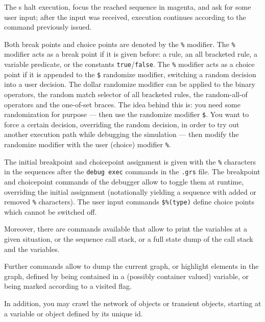 The s halt execution, focus the reached sequence in magenta, and ask for some user input;
after the input was received, execution continues according to the command previously issued.

Both break points and choice points are denoted by the \texttt{\%} modifier.
The \texttt{\%} modifier acts as a break point if it is given before: a rule, an all bracketed rule, a variable predicate, or the constants \texttt{true}/\texttt{false}.
The \texttt{\%} modifier acts as a choice point if it is appended to the \texttt{\$} randomize modifier, switching a random decision into a user decision.
The dollar randomize modifier can be applied to the binary operators, the random match selector of all bracketed rules, the random-all-of operators and the one-of-set braces.
The idea behind this is: you need some randomization for  purpose --- then use the randomize modifier \texttt{\$}.
You want to force a certain decision, overriding the random decision, in order to try out another execution path while debugging the simulation --- then modify the randomize modifier with the user (choice) modifier \texttt{\%}.

The initial breakpoint and choicepoint assignment is given with the \texttt{\%} characters in the sequences after the \texttt{debug exec} commands in the \texttt{.grs} file.
The breakpoint and choicepoint commands of the debugger allow to toggle them at runtime, overriding the initial assignment (notationally yielding a sequence with added or removed \texttt{\%} characters).
The user input commands \texttt{\$\%(type)} define choice points which cannot be switched off.

Moreover, there are commands available that allow to print the variables at a given situation, or the sequence call stack, or a full state dump of the call stack and the variables.

Further commands allow to dump the current graph, or highlight elements in the graph, defined by being contained in a (possibly container valued) variable, or being marked according to a visited flag.

In addition, you may crawl the network of objects or transient objects, starting at a variable or object defined by its unique id.


